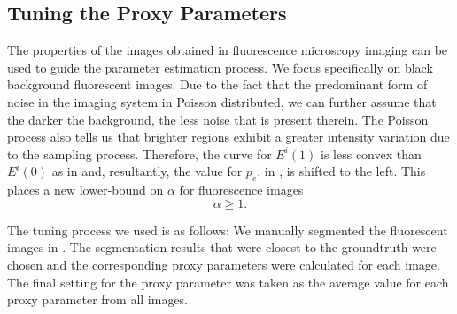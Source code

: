 \documentclass[10pt, journal, letterpaper, onecolumn, draftcls]{IEEEtran}
\begin{document}
\subsection{Tuning the Proxy Parameters}
The properties of the images obtained in fluorescence microscopy imaging can be used to guide the parameter estimation process. We focus specifically on black background fluorescent images. Due to the fact that the predominant form of noise in the imaging system in Poisson distributed, we can further assume that the darker the background, the less noise that is present therein. The Poisson process also tells us that brighter regions exhibit a greater intensity variation due to the sampling process. Therefore, the curve for $E^i(1)$ is less convex than $E^i(0)$ as in  and, resultantly, the value for $p_e$, in , is shifted to the left. This places a new lower-bound on $\alpha$ for fluorescence images
\begin{equation}
	\alpha \geq 1.
	\label{eq:alphalowerboundFM}
\end{equation}

The tuning process we used is as follows:
We manually segmented the fluorescent images in . The segmentation results that were closest to the groundtruth were chosen and the corresponding proxy parameters were calculated for each image. The final setting for the proxy parameter was taken as the average value for each proxy parameter from all images. 
\end{document}
